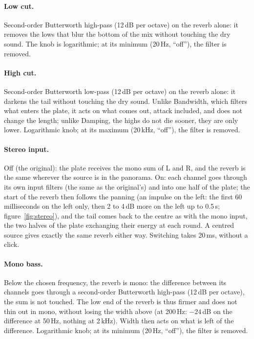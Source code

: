 \documentclass[a4paper,11pt]{article}
\newcommand{\dB}{\,dB}
\begin{document}
\paragraph{Low cut.} Second-order Butterworth high-pass (12\dB{} per octave) on the reverb
alone: it removes the lows that blur the bottom of the mix without touching the dry sound. The
knob is logarithmic; at its minimum (20\,Hz, ``off''), the filter is removed.

\paragraph{High cut.} Second-order Butterworth low-pass (12\dB{} per octave) on the reverb
alone: it darkens the tail without touching the dry sound. Unlike Bandwidth, which filters what
enters the plate, it acts on what comes out, attack included, and does not change the length;
unlike Damping, the highs do not die sooner, they are only lower. Logarithmic knob; at its
maximum (20\,kHz, ``off''), the filter is removed.

\paragraph{Stereo input.} Off (the original): the plate receives the mono sum of L and R, and
the reverb is the same wherever the source is in the panorama. On: each channel goes through its
own input filters (the same as the original's) and into one half of the plate; the start of the
reverb then follows the panning (an impulse on the left: the first 60 milliseconds on the left
only, then 2 to 4\dB{} more on the left up to 0.5\,s; figure~\ref{fig:stereo}), and the tail
comes back to the centre as with the mono input, the two halves of the plate exchanging their
energy at each round. A centred source gives exactly the same reverb either way. Switching
takes 20\,ms, without a click.

\paragraph{Mono bass.} Below the chosen frequency, the reverb is mono: the difference between
its channels goes through a second-order Butterworth high-pass (12\dB{} per octave), the sum is
not touched. The low end of the reverb is thus firmer and does not thin out in mono, without
losing the width above (at 200\,Hz: $-24$\dB{} on the difference at 50\,Hz, nothing at
2\,kHz). Width then acts on what is left of the difference. Logarithmic knob; at its minimum
(20\,Hz, ``off''), the filter is removed.
\end{document}

